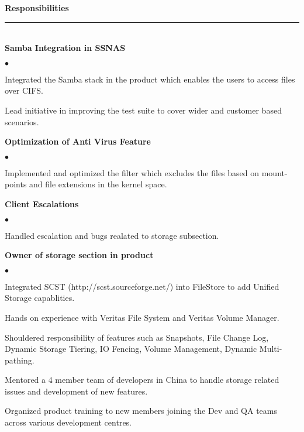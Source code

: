 \documentclass[letterpaper,margin,line]{RES}
\newenvironment{list2}{
  \begin{list}{$\bullet$}{%
      \setlength{\itemsep}{1pt}
      \setlength{\parsep}{0in} \setlength{\parskip}{0in}
      \setlength{\topsep}{0in} \setlength{\partopsep}{0in} 
      \setlength{\leftmargin}{0.2in}}}{\end{list}}
\def\mmyline{\\\rule{\textwidth}{.5pt}\\}
\begin{document}
\begin{resume}
{ \bf Responsibilities}
\mmyline

{ \bf Samba Integration in SSNAS  }
	\begin{list2}
    \item Integrated the Samba stack in the product which enables the users to access files over CIFS.
    \item Lead initiative in improving the test suite to cover wider and customer based scenarios.\end{list2}

{ \bf Optimization of Anti Virus Feature }
    \begin{list2}
    \item Implemented and optimized the filter which excludes the files based on mount-points and file extensions in the kernel space.
    \end{list2}

{ \bf Client Escalations }
    \begin{list2}
    \item Handled escalation and bugs realated to storage subsection.
    \end{list2}


{ \bf Owner of storage section in product }
    \begin{list2}
    \item Integrated SCST (http://scst.sourceforge.net/) into FileStore to add Unified Storage capablities.
    \item Hands on experience with Veritas File System and Veritas Volume Manager.
    \item Shouldered responsibility of features such as Snapshots, File Change Log, Dynamic Storage Tiering, IO Fencing, Volume Management, Dynamic Multi-pathing.
    \item Mentored a 4 member team of developers in China to handle storage related issues and development of new features.
    \item Organized product training to new members joining the Dev and QA teams across various development centres.
    \end{list2}


\end{resume}
\end{document}

